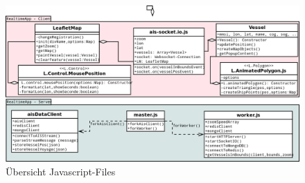 \begin{figure}[H]
  \centering
  \includegraphics[width=6in]{images/ais-socketio.png}
  \caption[Übersicht Javascript-Files]{Übersicht Javascript-Files}
  \label{fig:Übersicht Javascript-Files}
\end{figure}


